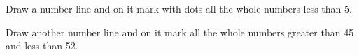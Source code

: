 \begin{examples}
    \begin{questions}
        \Question[1] Draw a number line and on it mark with dots all the whole numbers less than 5.
        \begin{solutionorbox}[2in]
            \begin{center}
            \end{center}
        \end{solutionorbox}
        \Question[1] Draw another number line and on it mark all the whole numbers greater than 45 and less than 52.
        \begin{solutionorbox}[2in]
            \begin{center}
            \end{center}
        \end{solutionorbox}
    \end{questions}
\end{examples}


